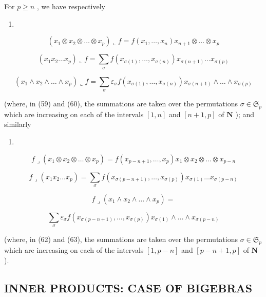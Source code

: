 For \(p \geqslant n\) , we have respectively

\begin{enumerate}
\def\labelenumi{(\arabic{enumi})}
\setcounter{enumi}{57}
\tightlist
\item
\end{enumerate}

\[
\left(x _ {1} \otimes x _ {2} \otimes \dots \otimes x _ {p}\right) \llcorner f = f \left(x _ {1}, \dots , x _ {n}\right) x _ {n + 1} \otimes \dots \otimes x _ {p}\tag{59}
\]

\[
\left(x _ {1} x _ {2} \dots x _ {p}\right) \llcorner f = \sum_ {\sigma} f \left(x _ {\sigma (1)}, \dots , x _ {\sigma (n)}\right) x _ {\sigma (n + 1)} \dots x _ {\sigma (p)}\tag{60}
\]

\[
\left(x _ {1} \wedge x _ {2} \wedge \dots \wedge x _ {p}\right) \llcorner f = \sum_ {\sigma} \varepsilon_ {\sigma} f \left(x _ {\sigma (1)}, \dots , x _ {\sigma (n)}\right) x _ {\sigma (n + 1)} \wedge \dots \wedge x _ {\sigma (p)}
\]

(where, in (59) and (60), the summations are taken over the permutations \(\sigma \in \mathfrak{S}_p\) which are increasing on each of the intervals \([1, n]\) and \([n + 1, p]\) of \(\mathbf{N}\) ); and similarly

\begin{enumerate}
\def\labelenumi{(\arabic{enumi})}
\setcounter{enumi}{60}
\tightlist
\item
\end{enumerate}

\[
f \lrcorner (x _ {1} \otimes x _ {2} \otimes \dots \otimes x _ {p}) = f (x _ {p - n + 1}, \dots , x _ {p}) x _ {1} \otimes x _ {2} \otimes \dots \otimes x _ {p - n}\tag{62}
\]

\[
f \lrcorner (x _ {1} x _ {2} \dots x _ {p}) = \sum_ {\sigma} f (x _ {\sigma (p - n + 1)}, \dots , x _ {\sigma (p)}) x _ {\sigma (1)} \dots x _ {\sigma (p - n)}\tag{63}
\]

\[
f \lrcorner (x _ {1} \wedge x _ {2} \wedge \dots \wedge x _ {p}) =
\]

\[
\sum_ {\sigma} \varepsilon_ {\sigma} f (x _ {\sigma (p - n + 1)}, \dots , x _ {\sigma (p)}) x _ {\sigma (1)} \wedge \dots \wedge x _ {\sigma (p - n)}
\]

(where, in (62) and (63), the summations are taken over the permutations \(\sigma \in \mathfrak{S}_p\) which are increasing on each of the intervals \([1, p - n]\) and \([p - n + 1, p]\) of \(\mathbf{N}\) ).

\subsection{INNER PRODUCTS: CASE OF BIGEBRAS}

